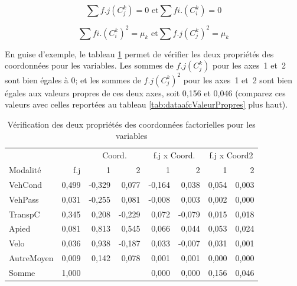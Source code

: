 \documentclass[
  11pt,
  french,
]{book}
\begin{document}
\footnotesize

\begin{equation}
\sum{f.j (C^k_j)}= 0 \text{ et} \sum{fi. (C^k_i)}= 0
\label{eq:CoordPropr1}
\end{equation}
\normalsize

\footnotesize

\begin{equation}
\sum{fi. (C^k_i)^2}= \mu_k \text{ et} \sum{f.j (C^k_j)^2}= \mu_k
\label{eq:CoordPropr2}
\end{equation}
\normalsize

En guise d'exemple, le tableau \ref{tab:dataafcCoordVars2} permet de vérifier les deux propriétés des coordonnées pour les variables. Les sommes de \({f.j (C^k_j)}\) pour les axes~1 et~2 sont bien égales à 0; et les sommes de \({f.j (C^k_j)^2}\) pour les axes~1 et~2 sont bien égales aux valeurs propres de ces deux axes, soit 0,156 et 0,046 (comparez ces valeurs avec celles reportées au tableau \ref{tab:dataafcValeurPropres} plus haut).

\begin{table}

\caption{\label{tab:dataafcCoordVars2}Vérification des deux propriétés des coordonnées factorielles pour les variables}
\centering
\fontsize{8}{10}\selectfont
\begin{tabular}[t]{lrrrrrrr}
\toprule
\multicolumn{2}{c}{ } & \multicolumn{2}{c}{Coord.} & \multicolumn{2}{c}{f.j x Coord.} & \multicolumn{2}{c}{f.j x Coord2} \\
\cmidrule(l{3pt}r{3pt}){3-4} \cmidrule(l{3pt}r{3pt}){5-6} \cmidrule(l{3pt}r{3pt}){7-8}
Modalité & f.j & 1 & 2 & 1 & 2 & 1 & 2\\
\midrule
VehCond & 0,499 & -0,329 & 0,077 & -0,164 & 0,038 & 0,054 & 0,003\\
VehPass & 0,031 & -0,255 & 0,081 & -0,008 & 0,003 & 0,002 & 0,000\\
TranspC & 0,345 & 0,208 & -0,229 & 0,072 & -0,079 & 0,015 & 0,018\\
Apied & 0,081 & 0,813 & 0,545 & 0,066 & 0,044 & 0,053 & 0,024\\
Velo & 0,036 & 0,938 & -0,187 & 0,033 & -0,007 & 0,031 & 0,001\\
\addlinespace
AutreMoyen & 0,009 & 0,142 & 0,078 & 0,001 & 0,001 & 0,000 & 0,000\\
Somme & 1,000 &  &  & 0,000 & 0,000 & 0,156 & 0,046\\
\bottomrule
\end{tabular}
\end{table}
\end{document}
